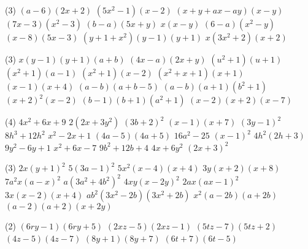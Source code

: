 \documentclass[a4paper,12pt]{report}
\begin{document}
\vspace*{-2\baselineskip}
\begin{core}
	\phantom{}
	\begin{tasks}(3)
		\task $(a-6)(2x+2)$
		\task $(5x^2-1)(x-2)$
		\task $(x+y+ax-ay)(x-y)$
		\task $(7x-3)(x^2-3)$
		\task $(b-a)(5x+y)$
		\task $x(x-y)$
		\task $(6-a)(x^2-y)$
		\task $(x-8)(5x-3)$
		\task $(y+1+x^2)(y-1)(y+1)$
		\task $x(3x^2+2)(x+2)$
	\end{tasks}
\end{core}
\begin{core}
	\phantom{}
\begin{tasks}(3)
	\task $x(y-1)(y+1)(a+b)$
	\task $(4x-a)(2x+y)$
	\task $(u^2+1)(u+1)$
	\task $(x^2+1)(a-1)$
	\task $(x^2+1)(x-2)$
	\task $(x^2+x+1)(x+1)$
	\task $(x-1)(x+4)$
	\task $(a-b)(a+b-5)$
	\task $(a-b)(a+1)(b^2+1)$
	\task $(x+2)^2(x-2)$
	\task $(b-1)(b+1)(a^2+1)$
	\task $(x-2)(x+2)(x-7)$
\end{tasks}
\end{core}
\begin{core}
	\phantom{}
	\begin{tasks}(4)
		\task $4x^2+6x+9$
		\task $2(2x+3y^2)$
		\task $(3b+2)^2$
		\task $(x-1)(x+7)$
		\task $(3y-1)^2$
		\task $8h^3+12h^2$
		\task $x^2-2x+1$
		\task $(4a-5)(4a+5)$
		\task $16a^2-25$
		\task $(x-1)^2$
		\task $4h^2(2h+3)$
		\task $9y^2-6y+1$
		\task $x^2+6x-7$
		\task $9b^2+12b+4$
		\task $4x+6y^2$
		\task $(2x+3)^2$
	\end{tasks}
\end{core}
\begin{core}
	\phantom{}
\begin{tasks}(3)
	\task $2x(y+1)^2$
		\task $5(3a-1)^2$
		\task $5x^2(x-4)(x+4)$
		\task $3y(x+2)(x+8)$
		\task $7a^2x(a-x)^2$
		\task $a(3a^2+4b^2)^2$
		\task $4xy(x-2y)^2$
		\task $2ax(ax-1)^2$
		\task $3x(x-2)(x+4)$
		\task $ab^2(3x^2-2b)(3x^2+2b)$
		\task $x^2(a-2b)(a+2b)$
		\task $(a-2)(a+2)(x+2y)$
\end{tasks}	
\end{core}

\begin{cora}\phantom{ }

\begin{tasks}(2)
\task ${{\left(6 r y-1\right)\left(6 r y+5 \right)}}$
\task ${{\left(2 x z-5 \right)\left(2 x z-1\right)}}$
\task ${{\left(5 t z-7 \right)\left(5 t z+2 \right)}}$
\task ${{\left(4 z-5 \right)\left(4 z-7 \right)}}$
\task ${{\left(8 y+1\right)\left(8 y+7 \right)}}$
\task ${{\left(6 t+7 \right)\left(6 t-5 \right)}}$
\end{tasks}

\end{cora}
\end{document}
